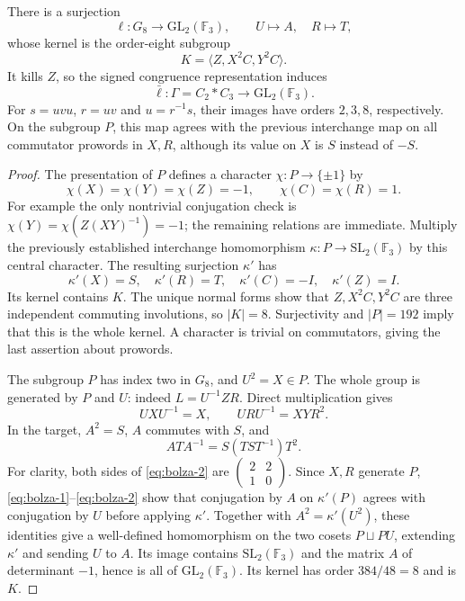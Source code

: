 \begin{proposition}\label{prop:genus-two-finite-quotient}
There is a surjection
\[
 \ell:G_8\longrightarrow\mathrm{GL}_2(\mathbb F_3),\qquad
 U\longmapsto A,\quad R\longmapsto T,
\]
whose kernel is the order-eight subgroup
\[
 K=\langle Z,X^2C,Y^2C\rangle.
\]
It kills $Z$, so the signed congruence representation induces
\[
 \bar\ell:\Gamma=C_2*C_3\longrightarrow
                 \mathrm{GL}_2(\mathbb F_3).
\]
For $s=uvu$, $r=uv$ and $u=r^{-1}s$, their images have orders
$2,3,8$, respectively.  On the subgroup $P$, this map agrees
with the previous interchange map on all commutator prowords in
$X,R$, although its value on $X$ is $S$ instead of $-S$.
\end{proposition}
\begin{proof}
The presentation of $P$ defines a character
$\chi:P\to\{\pm1\}$ by
\[
 \chi(X)=\chi(Y)=\chi(Z)=-1,\qquad
 \chi(C)=\chi(R)=1.
\]
For example the only nontrivial conjugation check is
$\chi(Y)=\chi(Z(XY)^{-1})=-1$; the remaining relations are
immediate.  Multiply the previously established interchange
homomorphism $\kappa:P\to\mathrm{SL}_2(\mathbb F_3)$ by this
central character.  The resulting surjection $\kappa'$ has
\[
 \kappa'(X)=S,\quad \kappa'(R)=T,\quad
 \kappa'(C)=-I,\quad\kappa'(Z)=I.
\]
Its kernel contains $K$.  The unique normal forms show that
$Z,X^2C,Y^2C$ are three independent commuting involutions, so
$|K|=8$.  Surjectivity and $|P|=192$ imply that this is the whole
kernel.  A character is trivial on commutators, giving the last
assertion about prowords.

The subgroup $P$ has index two in $G_8$, and $U^2=X\in P$.
The whole group is generated by $P$ and $U$: indeed
$L=U^{-1}ZR$.  Direct multiplication gives
\begin{equation}\label{eq:bolza-1}
UXU^{-1}=X,\qquad URU^{-1}=XYR^2.
\end{equation}
In the target, $A^2=S$, $A$ commutes with $S$, and
\begin{equation}\label{eq:bolza-2}
ATA^{-1}=S(TST^{-1})T^2.
\end{equation}
For clarity, both sides of \eqref{eq:bolza-2} are
$\left(\begin{smallmatrix}2&2\\1&0\end{smallmatrix}\right)$.
Since $X,R$ generate $P$, \eqref{eq:bolza-1}--\eqref{eq:bolza-2} show that conjugation by
$A$ on $\kappa'(P)$ agrees with conjugation by $U$ before
applying $\kappa'$.  Together with $A^2=\kappa'(U^2)$, these
identities give a well-defined homomorphism on the two cosets
$P\sqcup PU$, extending $\kappa'$ and sending $U$ to $A$.
Its image contains $\mathrm{SL}_2(\mathbb F_3)$ and the matrix
$A$ of determinant $-1$, hence is all of $\mathrm{GL}_2(\mathbb F_3)$.
Its kernel has order $384/48=8$ and is $K$.


\end{proof}
